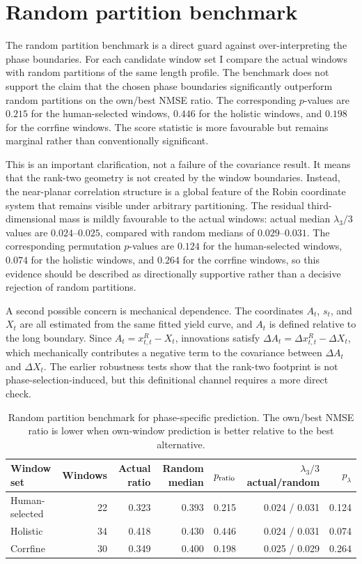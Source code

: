 \documentclass[11pt]{article}
\begin{document}
\section{Random partition benchmark}

The random partition benchmark is a direct guard against over-interpreting the phase boundaries. For each candidate window set I compare the actual windows with random partitions of the same length profile. The benchmark does not support the claim that the chosen phase boundaries significantly outperform random partitions on the own/best NMSE ratio. The corresponding $p$-values are $0.215$ for the human-selected windows, $0.446$ for the holistic windows, and $0.198$ for the corrfine windows. The score statistic is more favourable but remains marginal rather than conventionally significant.

This is an important clarification, not a failure of the covariance result. It means that the rank-two geometry is not created by the window boundaries. Instead, the near-planar correlation structure is a global feature of the Robin coordinate system that remains visible under arbitrary partitioning. The residual third-dimensional mass is mildly favourable to the actual windows: actual median $\lambda_3/3$ values are $0.024$--$0.025$, compared with random medians of $0.029$--$0.031$. The corresponding permutation $p$-values are $0.124$ for the human-selected windows, $0.074$ for the holistic windows, and $0.264$ for the corrfine windows, so this evidence should be described as directionally supportive rather than a decisive rejection of random partitions.

A second possible concern is mechanical dependence. The coordinates $A_t$, $s_t$, and $X_t$ are all estimated from the same fitted yield curve, and $A_t$ is defined relative to the long boundary. Since $A_t=x^R_{t,t}-X_t$, innovations satisfy $\Delta A_t=\Delta x^R_{t,t}-\Delta X_t$, which mechanically contributes a negative term to the covariance between $\Delta A_t$ and $\Delta X_t$. The earlier robustness tests show that the rank-two footprint is not phase-selection-induced, but this definitional channel requires a more direct check.

\begin{table}[!htbp]
\centering
\small
\begin{tabular}{lrrrrrr}
\toprule
Window set & Windows & Actual ratio & Random median & $p_{\rm ratio}$ & $\lambda_3/3$ actual/random & $p_{\lambda}$ \\
\midrule
Human-selected & 22 & 0.323 & 0.393 & 0.215 & 0.024 / 0.031 & 0.124 \\
Holistic & 34 & 0.418 & 0.430 & 0.446 & 0.024 / 0.031 & 0.074 \\
Corrfine & 30 & 0.349 & 0.400 & 0.198 & 0.025 / 0.029 & 0.264 \\
\bottomrule
\end{tabular}
\caption{Random partition benchmark for phase-specific prediction. The own/best NMSE ratio is lower when own-window prediction is better relative to the best alternative.}
\label{tab:random_partition}
\end{table}
\end{document}
